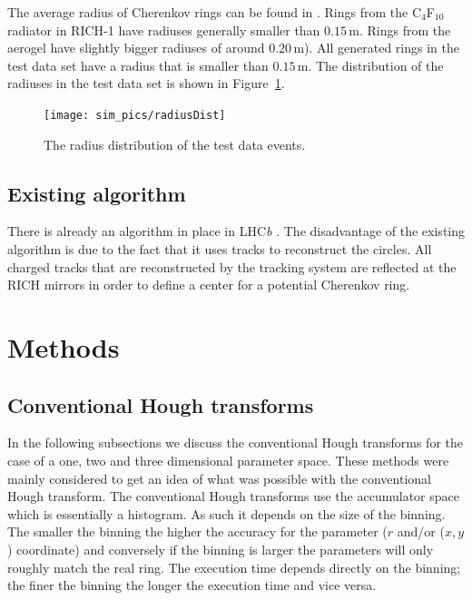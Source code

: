 \documentclass[11pt]{scrreprt}
\begin{document}
The average radius of Cherenkov rings can be found in \cite{Forty1999}. Rings from the C$_4$F$_{10}$ radiator in RICH-1 have radiuses generally smaller than $0.15$\,m. Rings from the aerogel have slightly bigger radiuses of around $0.20$\,m). All generated rings in the test data set have a radius that is smaller than $0.15$\,m. The distribution of the radiuses in the test data set is shown in Figure~\ref{fig:radius_dist}.

\begin{figure}[tb]
  \centering
  \texttt{[image: sim\_pics/radiusDist]}
  \caption{The radius distribution of the test data events.}
  \label{fig:radius_dist}
\end{figure}

\section{Existing algorithm} %
\label{sub:existing_algorithm}
There is already an algorithm in place in LHC\textit{b} \cite{Forty1999}. The disadvantage of the existing algorithm is due to the 
fact that it uses tracks to reconstruct the circles. All charged tracks that are reconstructed by the tracking system are reflected at
the RICH mirrors in order to define a center for a potential Cherenkov ring.


\chapter{Methods}

\section{Conventional Hough transforms} %
\label{sec:conventional_hough_transforms}

In the following subsections we discuss the conventional Hough transforms for the case of a one, two and three dimensional parameter space. 
These methods were mainly considered to get an idea of what was possible with the conventional Hough transform.
The conventional Hough transforms use the accumulator space which is essentially a histogram. As such it depends on the size of the binning. The smaller the binning the higher the accuracy for the parameter ($r$ and/or ($x,y$) coordinate) and conversely if the binning is larger the parameters will only roughly match the real ring. The execution time depends directly on the binning; the finer the binning the longer the execution time and vice versa.
\end{document}
